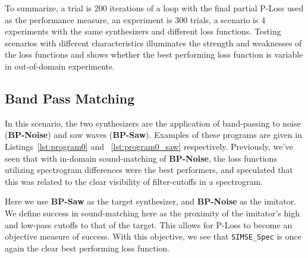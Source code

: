\documentclass{article} %
\newcommand{\SIMSESpec}{\texttt{SIMSE\_Spec}\xspace}
\newcommand{\BPNoise}{\textbf{BP-Noise}\xspace}
\newcommand{\BPSaw}{\textbf{BP-Saw}\xspace}
\begin{document}
To summarize, a trial is 200 iterations of a loop with the final partial P-Loss used as the performance measure, an experiment is 300 trials, a scenario is 4 experiments with the same synthesizers and different loss functions. Testing scenarios with different characteristics illuminates the strength and weaknesses of the loss functions and shows whether the best performing loss function is variable in out-of-domain experiments.


\subsection{Band Pass Matching}
In this scenario, the two synthesizers are the application of band-passing to noise (\BPNoise) and saw waves (\BPSaw). Examples of these programs are given in Listings~\ref{lst:program0} and ~\ref{lst:program0_saw} respectively. Previously, we've seen that with in-domain sound-matching of \BPNoise, the loss functions utilizing spectrogram differences were the best performers, and speculated that this was related to the clear visibility of filter-cutoffs in a spectrogram. 
 
 Here we use \BPSaw as the target synthesizer, and \BPNoise as the imitator. We define success in sound-matching here as the proximity of the imitator's high and low-pass cutoffs to that of the target. This allows for P-Loss to become an objective measure of success. With this objective, we see that \SIMSESpec is once again the clear best performing loss function.
\end{document}
